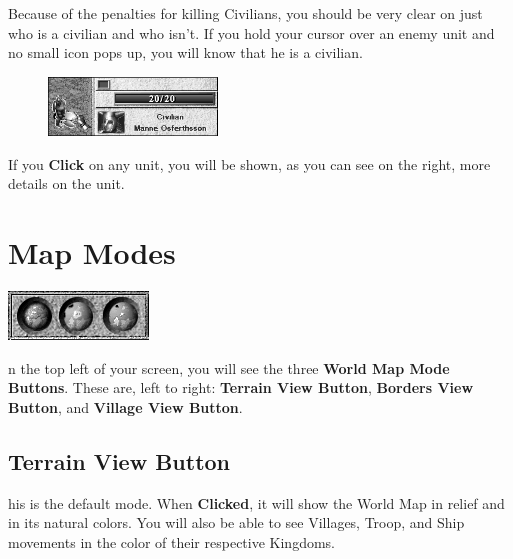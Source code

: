 
Because of the penalties for killing Civilians, you should be very clear on just who is a civilian and who isn’t. If you hold your cursor over an enemy unit and no small icon pops up, you will know that he is a civilian.

\begin{figure}
\vspace{-20pt}
    \begin{center}
        \includegraphics[width=0.4\textwidth]{Ipeasant2} %
\end{center}
\vspace{-20pt}
\end{figure}

If you \textbf{Click} on any unit, you will be shown, as you can see on the right, more details on the unit. \\

\section{\textsf{Map Modes}}


\begin{center}
    \includegraphics[width=0.3\linewidth]{Imapmode} %
\end{center}

n the top left of your screen, you will see the three \textbf{World Map Mode Buttons}. These are, left to right: \textbf{Terrain View Button}, \textbf{Borders View Button}, and \textbf{Village View Button}.

\subsection{\textsf{Terrain View Button}}


his is the default mode. When \textbf{Clicked}, it will show the World Map in relief and in its natural colors. You will also be able to see Villages, Troop, and Ship movements in the color of their respective Kingdoms.

